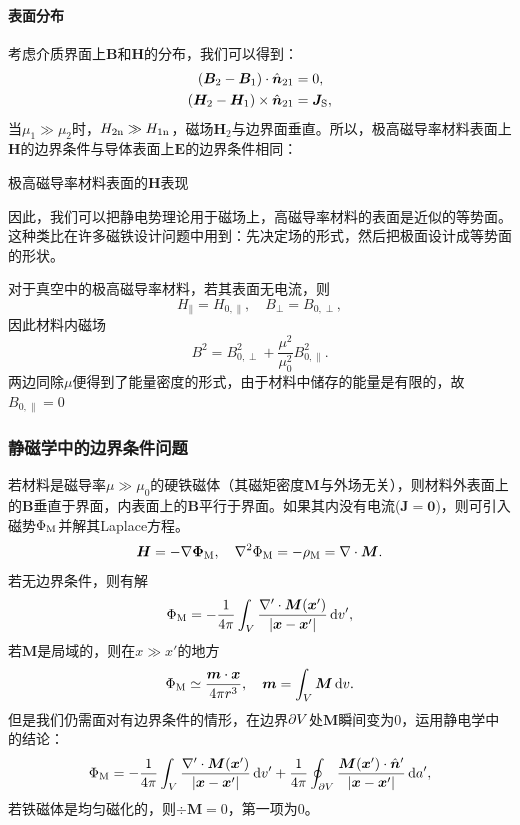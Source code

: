 \paragraph{表面分布}
考虑介质界面上$\bm B$和$\bm H$的分布，我们可以得到：
\begin{align}
    \label{eqn:Bn2-Bn1}
    (\bm B_2-\bm B_1)\cdot\mathop{}\!\hat{\bm n}_{21}&=0,\\
    \label{eqn:Ht2-Ht1}
    (\bm H_2-\bm H_1)\times\mathop{}\!\hat{\bm n}_{21}&=\bm J_\text S,
\end{align}
当$\mu_1\gg\mu_2$时，$H_{2\text n}\gg H_{1\text n}$，磁场$\bm H_2$与边界面垂直。所以，极高磁导率材料表面上$\bm H$的边界条件与导体表面上$\bm E$的边界条件相同：
\begin{center}
	\tikzchap 极高磁导率材料表面的$\bm H$表现
\end{center}
因此，我们可以把静电势理论用于磁场上，高磁导率材料的表面是近似的等势面。这种类比在许多磁铁设计问题中用到：先决定场的形式，然后把极面设计成等势面的形状。
\begin{example}{}{}
    对于真空中的极高磁导率材料，若其表面无电流，则
    \[
        H_\parallel=H_{0,\parallel},\quad B_\perp=B_{0,\perp},
    \]
    因此材料内磁场
    \[
        B^2=B_{0,\perp}^2+\frac{\mu^2}{\mu_0^2}B_{0,\parallel}^2.
    \]
    两边同除$\mu$便得到了能量密度的形式，由于材料中储存的能量是有限的，故$B_{0,\parallel}=0$
\end{example}
\subsubsection{静磁学中的边界条件问题}
若材料是磁导率$\mu\gg\mu_0$的硬铁磁体（其磁矩密度$\bm M$与外场无关），则材料外表面上的$\bm B$垂直于界面，内表面上的$\bm B$平行于界面。如果其内没有电流($\bm J=\bm0$)，则可引入磁势$\Phi_\text M$并解其Laplace方程。
\begin{equation}
    \bm H=-\nabla\bm\Phi_\text M,\quad\nabla^2\Phi_\text M=-\rho_\text M=\nabla\cdot\bm M.
\end{equation}
若无边界条件，则有解
\[
    \Phi_\text M=-\frac1{4\pi}\int_V\frac{\nabla'\cdot\bm M(\bm x')}{|\bm x-\bm x'|}\mathop{}\!\mathrm{d} v',
\]
若$\bm M$是局域的，则在$x\gg x'$的地方
\[
    \Phi_\text M\simeq\frac{\bm m\cdot\bm x}{4\pi r^3},\quad\bm m=\int_V\bm M\mathop{}\!\mathrm{d} v.
\]
但是我们仍需面对有边界条件的情形，在边界$\partial V$处$\bm M$瞬间变为0，运用静电学中的结论：
\begin{equation}
    \label{eqn:PhiM with boundary}
    \Phi_\text M=-\frac1{4\pi}\int_V\frac{\nabla'\cdot\bm M(\bm x')}{|\bm x-\bm x'|}\mathop{}\!\mathrm{d} v'+\frac1{4\pi}\oint_{\partial V}\frac{\bm M(\bm x')\cdot\mathop{}\!\hat{\bm n}'}{|\bm x-\bm x'|}\mathop{}\!\mathrm{d} a',
\end{equation}
若铁磁体是均匀磁化的，则$\div\bm M=0$，第一项为0。

